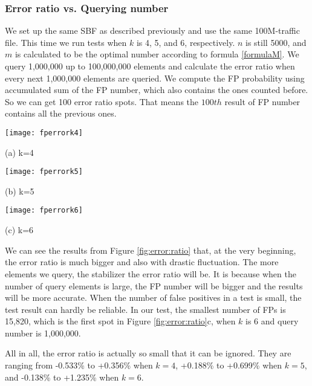  \subsubsection{Error ratio vs. Querying number}

 We set up the same SBF as described previously and use the same 100M-traffic file. This time we run tests when $k$ is 4, 5, and 6, respectively. $n$ is still 5000, and $m$ is calculated to be the optimal number according to formula \ref{formulaM}. We query 1,000,000 up to 100,000,000 elements and calculate the error ratio when every next 1,000,000 elements are queried. We compute the FP probability using accumulated sum of the FP number, which also contains the ones counted before. So we can get 100 error ratio spots. That means the $100th$ result of FP number contains all the previous ones.

 \begin{figure*}[htbp]
 	\begin{minipage}{0.32\linewidth}
 		\centerline{\texttt{[image: fperrork4]}}
 		\centerline{(a) k=4}
 	\end{minipage}
 	\hfill
 	\begin{minipage}{0.32\linewidth}
 		\centerline{\texttt{[image: fperrork5]}}
 		\centerline{(b) k=5}
 	\end{minipage}
 	\hfill
 	\begin{minipage}{0.32\linewidth}
 		\centerline{\texttt{[image: fperrork6]}}
 		\centerline{(c) k=6}
 	\end{minipage}
 	\caption{FP probability error ratio vs. \# of queries with different $k$.}
 	\label{fig:error:ratio}
 \end{figure*}

 We can see the results from Figure \ref{fig:error:ratio} that, at the very beginning, the error ratio is much bigger and also with drastic fluctuation. The more elements we query, the stabilizer the error ratio will be. It is because when the number of query elements is large, the FP number will be bigger and the results will be more accurate. When the number of false positives in a test is small, the test result can hardly be reliable. In our test, the smallest number of FPs is 15,820, which is the first spot in Figure \ref{fig:error:ratio}c, when $k$ is 6 and query number is 1,000,000.

 All in all, the error ratio is actually so small that it can be ignored. They are ranging from -0.533\% to +0.356\% when $k=4$, +0.188\% to +0.699\% when $k=5$, and -0.138\% to +1.235\% when $k=6$.

